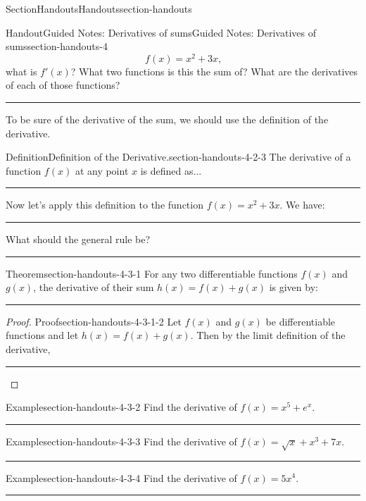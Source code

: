 \documentclass[oneside,10pt,]{article}
\newlength{\ptxworkspacestrutwidth}
\numberwithin{equation}{section}
\begin{document}
\begin{sectionptx}{Section}{Handouts}{}{Handouts}{}{}{section-handouts}
\begin{handout-subsection}{Handout}{Guided Notes: Derivatives of sums}{}{Guided Notes: Derivatives of sums}{}{}{section-handouts-4}
\begin{equation*}
f(x) = x^2 + 3x\text{,}
\end{equation*}
what is \(f'(x)\)?  What two functions is this the sum of?  What are the derivatives of each of those functions?%
\par\rule{\ptxworkspacestrutwidth}{1in}%
\par
To be sure of the derivative of the sum, we should use the definition of the derivative.%
\begin{definition}{Definition}{Definition of the Derivative.}{section-handouts-4-2-3}%
The derivative of a function \(f(x)\) at any point \(x\) is defined as...%
\par\rule{\ptxworkspacestrutwidth}{.75in}%
\end{definition}
Now let's apply this definition to the function \(f(x) = x^2 + 3x\). We have:%
\par\rule{\ptxworkspacestrutwidth}{2in}%
\par
What should the general rule be?%
\par\rule{\ptxworkspacestrutwidth}{0.25in}%
\clearpage
\begin{theorem}{Theorem}{}{}{section-handouts-4-3-1}%
For any two differentiable functions \(f(x)\) and \(g(x)\), the derivative of their sum \(h(x) = f(x) + g(x)\) is given by:%
\par\rule{\ptxworkspacestrutwidth}{0.5in}%
\end{theorem}
\begin{proof}{Proof}{}{section-handouts-4-3-1-2}
Let \(f(x)\) and \(g(x)\) be differentiable functions and let \(h(x) = f(x) + g(x)\).  Then by the limit definition of the derivative,%
\par\rule{\ptxworkspacestrutwidth}{3in}%
\end{proof}
\begin{example}{Example}{}{section-handouts-4-3-2}%
Find the derivative of \(f(x) = x^5 + e^x\).%
\par\rule{\ptxworkspacestrutwidth}{1in}%
\end{example}
\begin{example}{Example}{}{section-handouts-4-3-3}%
Find the derivative of \(f(x) = \sqrt{x} + x^3 + 7x\).%
\par\rule{\ptxworkspacestrutwidth}{1in}%
\end{example}
\begin{example}{Example}{}{section-handouts-4-3-4}%
Find the derivative of \(f(x) = 5x^4\).%
\par\rule{\ptxworkspacestrutwidth}{1in}%

\end{example}
\end{handout-subsection}
\end{sectionptx}
\end{document}
